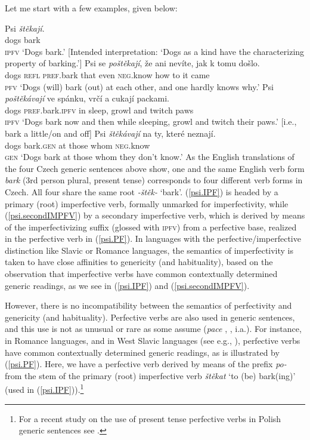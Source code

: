 \documentclass[output=paper,colorlinks,citecolor=brown]{langscibook}
\begin{document}
Let me start with a few examples, given below:  

\ea  %
\ea\label{psi.IPF}
\gll Psi \textit{štěkají}.\\
dogs bark \\ \hfill  \textsc{ipfv}     
\glt `Dogs bark.' [Intended interpretation: `Dogs as a kind have the characterizing property of barking.'] 
\ex\label{psi.PF}
\gll Psi se \textit{poštěkají}, že ani nevíte, jak k tomu došlo. \\ 
dogs \textsc{refl} \textsc{pref}.bark that even \textsc{neg}.know how to it came\\   \hfill  \textsc{pfv}
\glt `Dogs (will) bark (out) at each other, and one hardly knows why.' 
\ex\label{psi.secondIMPFV}
\gll Psi \textit{poštěkávají} 
ve spánku, vrčí a cukají packami. \\ 
dogs \textsc{pref}.bark.\textsc{ipfv} in sleep, growl and twitch paws\\ \hfill \textsc{ipfv}
\glt `Dogs bark now and then while sleeping, growl and twitch their paws.' [i.e., bark a little/on and off] 
\ex\label{psi.GEN}
\gll Psi \textit{štěkávají} na ty, které neznají.    \\
dogs bark.\textsc{gen} at those whom \textsc{neg}.know \\  \hfill \textsc{gen}
\glt `Dogs bark at those whom they don't know.'		
\z
\z
\noindent
As the English translations of the four Czech generic sentences above show, one and the same English verb form \textit{bark} (3rd person plural, present tense) corresponds to four different verb forms in Czech.
All four share the same root \textit{-štěk-} `bark'. (\ref{psi.IPF}) is headed by
a primary (root) imperfective verb, 
formally unmarked for imperfectivity, while 
(\ref{psi.secondIMPFV}) by a secondary imperfective verb,
which is derived by means of the imperfectivizing suffix
(glossed with \textsc{ipfv}) from a perfective base, realized in the perfective verb in (\ref{psi.PF}). 
In languages with the perfective/imperfective distinction like Slavic or Romance languages, the semantics of imperfectivity is 
taken to have close affinities to genericity (and habituality), based on the observation that imperfective verbs have common contextually determined generic readings, as we see in (\ref{psi.IPF}) and (\ref{psi.secondIMPFV}). 

However, there is no incompatibility between the semantics of perfectivity and genericity (and habituality). Perfective verbs are also used in generic sentences, and this use is not as unusual or rare as some
assume
(\textit{pace} \citealt{Comrie1976}, \citealt{dahl1995}, i.a.). For instance, 
in Romance languages, and in West Slavic languages (see e.g., \citealt{filip1997suigenva}), perfective 
verbs have common contextually determined generic readings, as is illustrated by (\ref{psi.PF}).
Here, we have a perfective verb derived by means of the prefix \textit{po-} from the stem of the primary (root) imperfective verb  \textit{štěkat} `to (be) bark(ing)' (used in (\ref{psi.IPF})).\footnote{For a recent study on the use of present tense perfective verbs in Polish generic sentences see \citet{wiemer2025}.}
\end{document}
